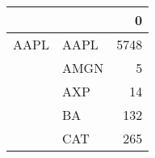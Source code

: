 \begin{tabular}{llr}
\toprule
     &     &     0 \\
\midrule
AAPL & AAPL &  5748 \\
     & AMGN &     5 \\
     & AXP &    14 \\
     & BA &   132 \\
     & CAT &   265 \\
\bottomrule
\end{tabular}

